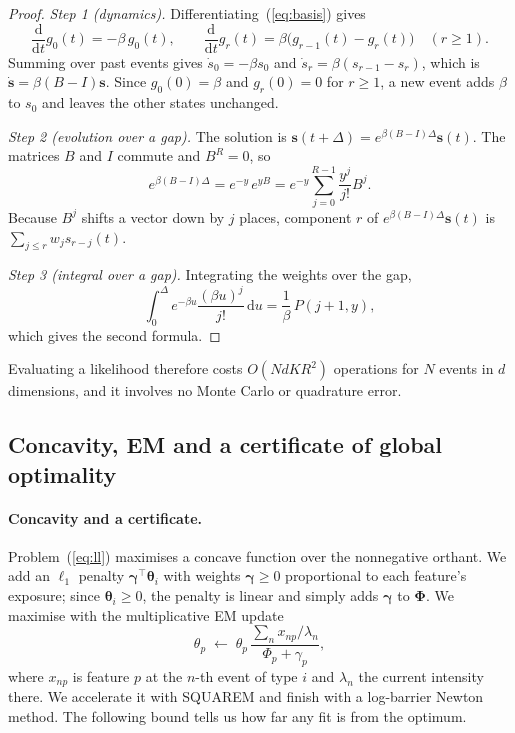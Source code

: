 \begin{proof}
\emph{Step 1 (dynamics).} Differentiating~(\ref{eq:basis}) gives
\[
\frac{\mathrm{d}}{\mathrm{d}t}g_0(t)=-\beta\,g_0(t),\qquad
\frac{\mathrm{d}}{\mathrm{d}t}g_r(t)=\beta\bigl(g_{r-1}(t)-g_r(t)\bigr)\quad(r\ge1).
\]
Summing over past events gives $\dot s_0=-\beta s_0$ and $\dot s_r=\beta(s_{r-1}-s_r)$, which is
$\dot{\bm s}=\beta(B-I)\bm s$. Since $g_0(0)=\beta$ and $g_r(0)=0$ for $r\ge1$, a new event adds $\beta$ to
$s_0$ and leaves the other states unchanged.

\emph{Step 2 (evolution over a gap).} The solution is $\bm s(t+\Delta)=e^{\beta(B-I)\Delta}\bm s(t)$.
The matrices $B$ and $I$ commute and $B^R=0$, so
\[
e^{\beta(B-I)\Delta}=e^{-y}\,e^{yB}=e^{-y}\sum_{j=0}^{R-1}\frac{y^j}{j!}B^j .
\]
Because $B^j$ shifts a vector down by $j$ places, component $r$ of $e^{\beta(B-I)\Delta}\bm s(t)$
is $\sum_{j\le r}w_j s_{r-j}(t)$.

\emph{Step 3 (integral over a gap).} Integrating the weights over the gap,
\[
\int_0^{\Delta}e^{-\beta u}\frac{(\beta u)^j}{j!}\,\mathrm{d}u=\frac{1}{\beta}\,P(j+1,y),
\]
which gives the second formula.
\end{proof}

Evaluating a likelihood therefore costs $O(N d K R^2)$ operations for $N$ events in $d$
dimensions, and it involves no Monte Carlo or quadrature error.

\subsection{Concavity, EM and a certificate of global optimality}
\paragraph{Concavity and a certificate.} Problem~(\ref{eq:ll}) maximises a concave function over
the nonnegative orthant. We add an $\ell_1$ penalty $\bm\gamma^\top\bm\theta_i$ with weights
$\bm\gamma\ge0$ proportional to each feature's exposure; since $\bm\theta_i\ge0$, the penalty is
linear and simply adds $\bm\gamma$ to $\bm\Phi$. We maximise with the multiplicative EM update
\[
\theta_p\;\leftarrow\;\theta_p\,\frac{\sum_n x_{np}/\lambda_n}{\Phi_p+\gamma_p},
\]
where $x_{np}$ is feature $p$ at the $n$-th event of type $i$ and $\lambda_n$ the current intensity
there. We accelerate it with SQUAREM \citep{varadhan2008simple} and finish with a log-barrier
Newton method. The following bound tells us how far any fit is from the optimum.

